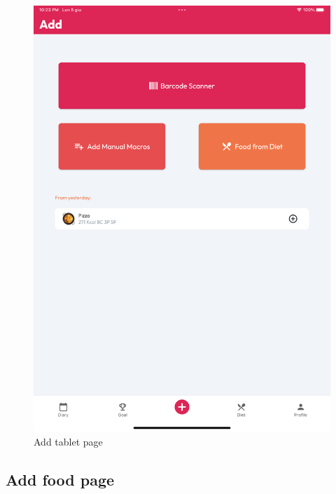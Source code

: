 \documentclass{Configuration_Files/PoliMi3i_thesis}
\begin{document}
\begin{figure}[!h]
  \includegraphics[scale=0.1]{Images/Screenshots/Tablet/AddTabletLight.png}
  \caption{Add tablet page}
\end{figure}

\clearpage

\subsection{Add food page}
\end{document}
